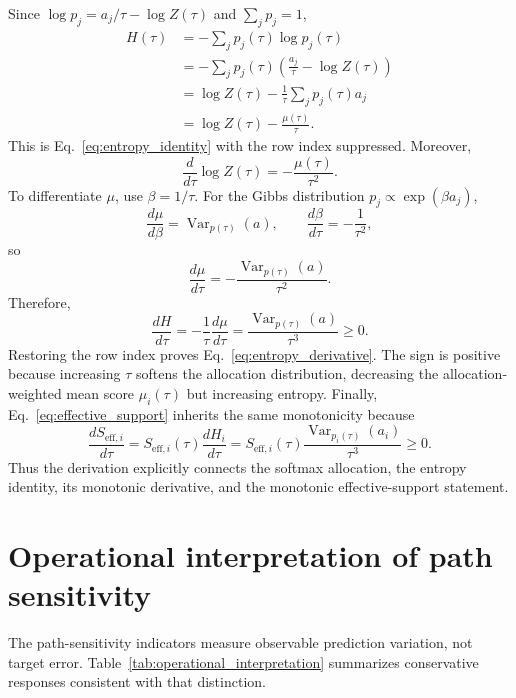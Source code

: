 \documentclass[preprint,12pt,authoryear]{elsarticle}
\begin{document}
Since $\log p_j=a_j/\tau-\log Z(\tau)$ and $\sum_jp_j=1$,
\begin{align}
  H(\tau)
  &=-\sum_j p_j(\tau)\log p_j(\tau) \\
  &=-\sum_jp_j(\tau)\left(\frac{a_j}{\tau}-\log Z(\tau)\right) \\
  &=\log Z(\tau)-\frac{1}{\tau}\sum_jp_j(\tau)a_j \\
  &=\log Z(\tau)-\frac{\mu(\tau)}{\tau}.
\end{align}
This is Eq.~\eqref{eq:entropy_identity} with the row index suppressed. Moreover,
\begin{equation}
  \frac{d}{d\tau}\log Z(\tau)
  =-\frac{\mu(\tau)}{\tau^2}.
\end{equation}
To differentiate $\mu$, use $\beta=1/\tau$. For the Gibbs distribution $p_j\propto\exp(\beta a_j)$,
\begin{equation}
  \frac{d\mu}{d\beta}=\operatorname{Var}_{p(\tau)}(a),
  \qquad
  \frac{d\beta}{d\tau}=-\frac{1}{\tau^2},
\end{equation}
so
\begin{equation}
  \frac{d\mu}{d\tau}=-\frac{\operatorname{Var}_{p(\tau)}(a)}{\tau^2}.
\end{equation}
Therefore,
\begin{equation}
  \frac{dH}{d\tau}
  =-\frac{1}{\tau}\frac{d\mu}{d\tau}
  =\frac{\operatorname{Var}_{p(\tau)}(a)}{\tau^3}\ge 0.
\end{equation}
Restoring the row index proves Eq.~\eqref{eq:entropy_derivative}. The sign is positive because increasing $\tau$ softens the allocation distribution, decreasing the allocation-weighted mean score $\mu_i(\tau)$ but increasing entropy. Finally, Eq.~\eqref{eq:effective_support} inherits the same monotonicity because
\[
  \frac{dS_{\mathrm{eff},i}}{d\tau}
  =S_{\mathrm{eff},i}(\tau)\frac{dH_i}{d\tau}
  =S_{\mathrm{eff},i}(\tau)
   \frac{\operatorname{Var}_{p_i(\tau)}(a_i)}{\tau^3}\ge 0.
\]
Thus the derivation explicitly connects the softmax allocation, the entropy identity, its monotonic derivative, and the monotonic effective-support statement.

\section{Operational interpretation of path sensitivity}
\label{app:operational_interpretation}

The path-sensitivity indicators measure observable prediction variation, not target error. Table~\ref{tab:operational_interpretation} summarizes conservative responses consistent with that distinction.
\end{document}
